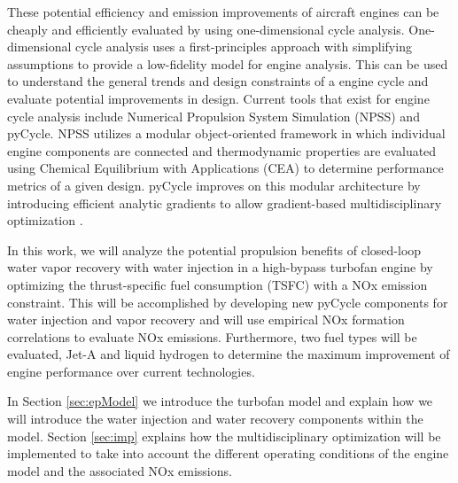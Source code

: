 \documentclass[]{icas2022}
\begin{document}
These potential efficiency and emission improvements of aircraft engines can be cheaply and efficiently evaluated by using one-dimensional cycle analysis. 
One-dimensional cycle analysis uses a first-principles approach with simplifying assumptions to provide a low-fidelity model for engine analysis. 
This can be used to understand the general trends and design constraints of a engine cycle and evaluate potential improvements in design. Current tools that exist for engine cycle analysis include Numerical Propulsion System Simulation (NPSS) and pyCycle. 
NPSS utilizes a modular object-oriented framework in which individual engine components are connected and thermodynamic properties are evaluated using Chemical Equilibrium with Applications (CEA) to determine performance metrics of a given design. 
pyCycle improves on this modular architecture by introducing efficient analytic gradients to allow gradient-based multidisciplinary optimization \cite{Hendricks2019}. 

In this work, we will analyze the potential propulsion benefits of closed-loop water vapor recovery with water injection in a high-bypass turbofan engine by optimizing the thrust-specific fuel consumption (TSFC) with a NOx emission constraint. 
This will be accomplished by developing new pyCycle components for water injection and vapor recovery and will use empirical NOx formation correlations to evaluate NOx emissions.
Furthermore, two fuel types will be evaluated, Jet-A and liquid hydrogen to determine the maximum improvement of engine performance over current technologies.

In Section \ref{sec:epModel} we introduce the turbofan model and explain how we will introduce the water injection and water recovery components within the model.
Section \ref{sec:imp} explains how the multidisciplinary optimization will be implemented to take into account the different operating conditions of the engine model and the associated NOx emissions.
\end{document}
